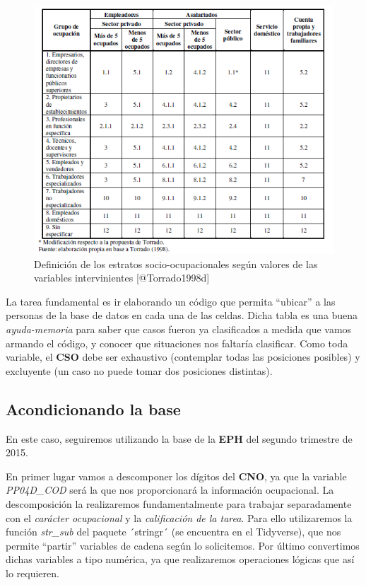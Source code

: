 \documentclass[
]{book}
\begin{document}
\begin{figure}

{\centering \includegraphics[width=0.8\linewidth]{imagenes/torrado_cso} 

}

\caption{Definición de los estratos socio-ocupacionales según valores de las variables intervinientes [@Torrado1998d]}\label{fig:unnamed-chunk-71}
\end{figure}

La tarea fundamental es ir elaborando un código que permita ``ubicar'' a las personas de la base de datos en cada una de las celdas. Dicha tabla es una buena \emph{ayuda-memoria} para saber que casos fueron ya clasificados a medida que vamos armando el código, y conocer que situaciones nos faltaría clasificar. Como toda variable, el \textbf{CSO} debe ser exhaustivo (contemplar todas las posiciones posibles) y excluyente (un caso no puede tomar dos posiciones distintas).

\hypertarget{acondicionando-la-base}{%
\subsection{Acondicionando la base}\label{acondicionando-la-base}}

En este caso, seguiremos utilizando la base de la \textbf{EPH} del segundo trimestre de 2015.

En primer lugar vamos a descomponer los dígitos del \textbf{CNO}, ya que la variable \emph{PP04D\_COD} será la que nos proporcionará la información ocupacional. La descomposición la realizaremos fundamentalmente para trabajar separadamente con el \emph{carácter ocupacional} y la \emph{calificación de la tarea}. Para ello utilizaremos la función \emph{str\_sub} del paquete ´stringr´ (se encuentra en el Tidyverse), que nos permite ``partir'' variables de cadena según lo solicitemos. Por último convertimos dichas variables a tipo numérica, ya que realizaremos operaciones lógicas que así lo requieren.
\end{document}
